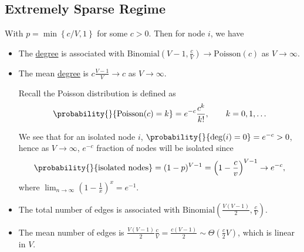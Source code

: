 \subsection{Extremely Sparse Regime}\label{subsec:extremely-sparse-regime}
With \(p = \min\left\{c / V, 1\right\}\) for some \(c>0\). Then for node \(i\), we have
\begin{itemize}
	\item The \hyperref[def:degree]{degree} is associated with \(\mathrm{Binomial}(V - 1, \frac{c}{V}) \to \mathrm{Poisson}(c) \) as \(V\to \infty \).
	\item The mean \hyperref[def:degree]{degree} is \(c \frac{V-1}{V}\to c\) as \(V\to \infty.\)
	      \begin{note}
		      Recall the Poisson distribution is defined as
		      \[
			      \probability{}{ \mathrm{Poisson}(c)=k } = e^{-c} \frac{c^k}{k!}, \qquad k = 0, 1, \ldots
		      \]
	      \end{note}
	      We see that for an isolated node \(i\), \(\probability{}{ \deg(i) =0} = e^{-c} > 0\), hence
	      as \(V\to \infty \), \(e^{-c}\) fraction of nodes will be isolated since
	      \[
		      \probability{}{ \text{isolated nodes}} = (1 - p)^{V - 1} = \left(1 - \frac{c}{v}\right)^{V-1} \to e^{-c},
	      \]
	      where \(\lim_{n \to \infty} \left(1 - \frac{1}{x}\right)^x = e^{-1}\).
	\item The total number of edges is associated with \(\mathrm{Binomial}\left(\frac{V(V-1)}{2}, \frac{c}{V}\right)\).
	\item The mean number of edges is \(\frac{V(V - 1)}{2}\frac{c}{V} = \frac{c(V - 1)}{2}\sim \Theta(\frac{c}{2}V)\), which is linear in \(V\).
\end{itemize}


